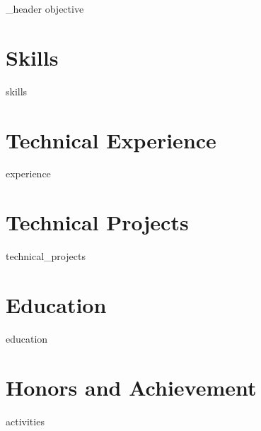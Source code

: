 \documentclass[letter,10pt]{article}
\author{Ravi Patel} %
\begin{document}
{_header}
{objective}

\section{Skills}
{skills}

\section{Technical Experience}
{experience}

\section{Technical Projects}
{technical_projects}


\section{Education}
{education}


\section{Honors and Achievement }
{activities}
\end{document}
